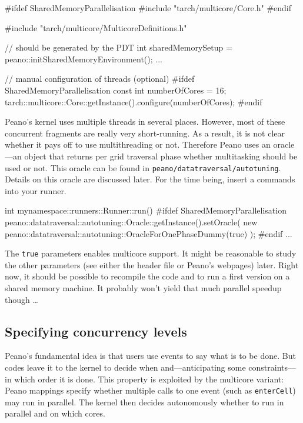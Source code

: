 \begin{code}
#ifdef SharedMemoryParallelisation
#include "tarch/multicore/Core.h"
#endif

#include "tarch/multicore/MulticoreDefinitions.h"

  // should be generated by the PDT
  int sharedMemorySetup = peano::initSharedMemoryEnvironment();
  ...


  // manual configuration of threads (optional)
  #ifdef SharedMemoryParallelisation
  const int         numberOfCores    = 16;
  tarch::multicore::Core::getInstance().configure(numberOfCores);
  #endif

\end{code}

\noindent
Peano's kernel uses multiple threads in several places. 
However, most of these concurrent fragments are really very short-running.
As a result, it is not clear whether it pays off to use multithreading or not.
Therefore Peano uses an oracle---an object that returns per grid
traversal phase whether multitasking should be used or not.
This oracle can be found in \texttt{peano/datatraversal/autotuning}. 
Details on this oracle are discussed later.
For the time being, insert a commands into your runner.

\begin{code}
int mynamespace::runners::Runner::run() {
  #ifdef SharedMemoryParallelisation
  peano::datatraversal::autotuning::Oracle::getInstance().setOracle(
    new peano::datatraversal::autotuning::OracleForOnePhaseDummy(true)
  );
  #endif
  ...
}
\end{code}

\noindent
The \texttt{true} parameters enables multicore support.
It might be reasonable to study the other parameters (see either the header
file or Peano's webpages) later.
Right now, it should be possible to recompile the code and to run a first
version on a shared memory machine.
It probably won't yield that much parallel speedup though \ldots


\subsection{Specifying concurrency levels}

Peano's fundamental idea is that users use events to say what is to be done. 
But codes leave it to the kernel to decide when and---anticipating some
constraints---in which order it is done.
This property is exploited by the multicore variant: 
Peano mappings specify whether multiple calls to one event (such as
\texttt{enterCell}) may run in parallel.
The kernel then decides autonomously whether to run in parallel and on which
cores.


